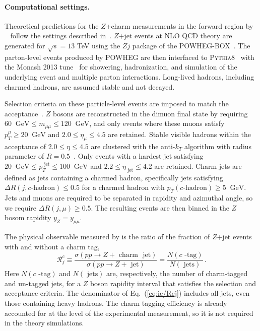 \paragraph{Computational settings.}
%
Theoretical predictions for
the $Z$+charm measurements in the forward region 
by \lhcb~\cite{LHCb:2021stx} follow the 
 settings described in~\cite{Boettcher:2015sqn}.
%
$Z$+jet events at NLO QCD theory are generated for $\sqrt{s}= 13$ TeV  using the $Zj$ package of the
\textsc{\small POWHEG-BOX}~\cite{Alioli:2010xd}.
%
The parton-level events produced by \textsc{\small POWHEG}
are then interfaced to \textsc{\small Pythia8}~\cite{Sjostrand:2007gs}
with the Monash 2013 tune~\cite{Skands:2014pea} for showering,
hadronization, and simulation of the underlying event and multiple
parton interactions.
%
Long-lived hadrons, including charmed hadrons,
are assumed stable and not decayed.

Selection criteria on these particle-level events are imposed
to match the \lhcb acceptance~\cite{LHCb:2021stx}.
%
$Z$ bosons are reconstructed in the dimuon final state by
requiring $60~\textrm{ GeV}\le m_{\mu\mu} \le 120~\textrm{ GeV}$,
and
only events where these muons satisfy
    $p_T^\mu \ge 20~\textrm{ GeV}$ and $2.0 \le \eta_{\mu}\le 4.5$
    are retained.
%
Stable visible hadrons within the \lhcb acceptance of
$2.0 \le \eta \le 4.5$ are clustered with
the anti-$k_T$ algorithm with radius parameter
of $R=0.5$~\cite{Cacciari:2008gp}.
%
Only events with a hardest jet satisfying
  $ 20~\textrm{ GeV} \le p_T^\textrm{ jet} \le 100~\textrm{ GeV}$
and $2.2 \le \eta_\textrm{ jet}\le 4.2$ are retained.
%
Charm jets are defined as jets containing
a charmed hadron, specifically  jets satisfying
$\Delta R(j, c\textrm{-hadron})\le 0.5$ for a charmed
hadron with $p_T(c\textrm{-hadron})\ge 5~\textrm{ GeV}$.
%
Jets and muons are required to be separated
in rapidity and azimuthal angle, so
we require $\Delta R(j, \mu)\ge 0.5$.
%
The resulting events
are then binned in the $Z$ bosom rapidity $y_Z = y_{\mu \mu}$.

The physical observable measured by \lhcb is the ratio of the fraction of $Z$+jet
    events with and without a charm tag,
    \begin{equation}
    \label{eq:ic/Rcj}
        \mathcal{R}_j^c \equiv \frac{\sigma(pp\to Z+\textrm{ charm~ jet})}{\sigma(pp \to Z+\textrm{ jet})}=
         \frac{N(c\textrm{ -tag})}{ 
        N(\textrm{ jets})} \, .
    \end{equation}
 Here  $N(c\textrm{ -tag})$ and $N(\textrm{ jets})$ are, respectively, the number
    of charm-tagged and un-tagged jets, for a  $Z$ boson rapidity interval
    that satisfies the selection and acceptance criteria.
    The denominator of Eq.~(\ref{eq:ic/Rcj}) includes all jets, even those
    containing heavy hadrons.
The charm tagging efficiency is already accounted for at the level
of the experimental measurement, so it is not required in the theory
simulations.


